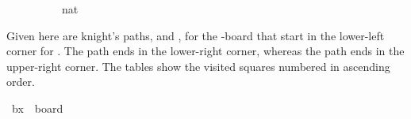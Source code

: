 \begin{isabellebody}
\ \ {\isacharbrackleft}{\kern0pt}{}{}{\isacharcomma}{\kern0pt}{}{}{\isacharcomma}{\kern0pt}{}{\isacharcomma}{\kern0pt}{}{}{\isacharcomma}{\kern0pt}{}{}{\isacharbrackright}{\kern0pt}{\isacharcomma}{\kern0pt}\isanewline
\ \ {\isacharbrackleft}{\kern0pt}{}{}{\isacharcomma}{\kern0pt}{}{\isacharcomma}{\kern0pt}{}{}{\isacharcomma}{\kern0pt}{}{\isacharcomma}{\kern0pt}{}{\isacharbrackright}{\kern0pt}{\isacharcomma}{\kern0pt}\isanewline
\ \ {\isacharbrackleft}{\kern0pt}{}{}{\isacharcomma}{\kern0pt}{}{}{\isacharcomma}{\kern0pt}{}{\isacharcomma}{\kern0pt}{}{}{\isacharcomma}{\kern0pt}{}{}{\isacharbrackright}{\kern0pt}{\isacharcomma}{\kern0pt}\isanewline
\ \ {\isacharbrackleft}{\kern0pt}{}{\isacharcomma}{\kern0pt}{}{}{\isacharcomma}{\kern0pt}{}{}{\isacharcomma}{\kern0pt}{}{}{\isacharcomma}{\kern0pt}{}{\isacharcolon}{\kern0pt}{\isacharcolon}{\kern0pt}nat{\isacharbrackright}{\kern0pt}{\isacharbrackright}{\kern0pt}{\isachardoublequoteclose}%
\isadelimdocument
%
\endisadelimdocument
%
\isatagdocument
%
\isamarkuptrue%
%
\endisatagdocument
{\isafolddocument}%
%
\isadelimdocument
%
\endisadelimdocument
%
\begin{isamarkuptext}%
Given here are knight's paths,  and , for the -board that start 
in the lower-left corner for . The path  ends in the lower-right corner, 
whereas the path  ends in the upper-right corner. 
The tables show the visited squares numbered in ascending order.%
\end{isamarkuptext}\isamarkuptrue%
\isamarkupfalse%
\ {\isachardoublequoteopen}b{}x{}\ {\isasymequiv}\ board\ {}\ {}{\isachardoublequoteclose}%

\end{isabellebody}
